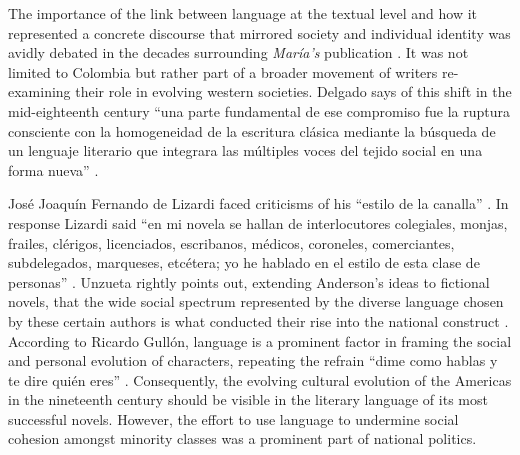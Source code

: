 The importance of the link between language at the textual level and how it represented a concrete discourse that mirrored society and individual identity was avidly debated in the decades surrounding \textit{María's} publication \autocite[4]{Delgado2000}.
It was not limited to Colombia but rather part of a broader movement of writers re-examining their role in evolving western societies.
Delgado says of this shift in the mid-eighteenth century \enquote{una parte fundamental de ese compromiso fue la ruptura consciente con la homogeneidad de la escritura clásica mediante la búsqueda de un lenguaje literario que integrara las múltiples voces del tejido social en una forma nueva} \autocite[11]{Delgado2000}.

José Joaquín Fernando de Lizardi faced criticisms of his \enquote{estilo de la canalla} \autocite[144]{Unzueta2003}.
In response Lizardi said \enquote{en mi novela se hallan de interlocutores colegiales, monjas, frailes, clérigos, licenciados, escribanos, médicos, coroneles, comerciantes, subdelegados, marqueses, etcétera; yo he hablado en el estilo de esta clase de personas} \autocite[144]{Unzueta2003}.
Unzueta rightly points out, extending Anderson's ideas to fictional novels, that the wide social spectrum represented by the diverse language chosen by these certain authors is what conducted their rise into the national construct \autocite[144]{Unzueta2003}.
According to Ricardo Gullón, language is a prominent factor in framing the social and personal evolution of characters, repeating the refrain \enquote{dime como hablas y te dire quién eres} \autocite[11]{Delgado2000}.
Consequently, the evolving cultural evolution of the Americas in the nineteenth century should be visible in the literary language of its most successful novels.
However, the effort to use language to undermine social cohesion amongst minority classes was a prominent part of national politics.

